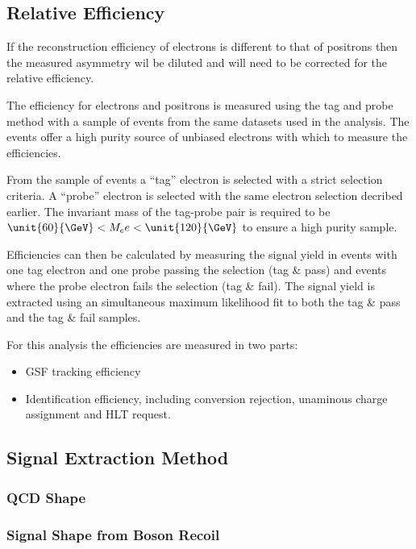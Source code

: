 \subsection{Relative Efficiency}

If the reconstruction efficiency of electrons is different to that of positrons
then the measured asymmetry wil be diluted and will need to be corrected for
the relative efficiency.

The efficiency for electrons and positrons is measured using the tag and probe
method %
with a sample of \Zee events from the same datasets used in the analysis. 
The \Zee events offer a high purity source of unbiased electrons with which to
measure the efficiencies.

From the sample of \Zee events a ``tag'' electron is selected with a strict
selection criteria. 
A ``probe'' electron is selected with the same electron selection decribed
earlier.
The invariant mass of the tag-probe pair is required to be
$\unit{60}{\GeV} < M_ee < \unit{120}{\GeV}$ to ensure a high purity sample.

Efficiencies can then be calculated by measuring the signal yield in events
with one tag electron and one probe passing the selection (tag \& pass) and
events where the probe electron fails the selection (tag \& fail).
The signal yield is extracted using an simultaneous maximum likelihood fit to
both the tag \& pass and the tag \& fail samples.

For this analysis the efficiencies are measured in two parts:

\begin{itemize}
    \item GSF tracking efficiency
    \item Identification efficiency, including conversion rejection, unaminous
charge assignment and HLT request.
\end{itemize}





\subsection{Signal Extraction Method}
\subsubsection{QCD \ETm Shape}
\subsubsection{Signal \ETm Shape from Boson Recoil}
